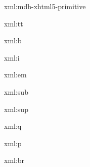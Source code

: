 
\startxmlsetups xml:mdb-xhtml5-primitive
\stopxmlsetups


\startxmlsetups xml:tt
	{\tt {}}
\stopxmlsetups

\startxmlsetups xml:b
	{\bf {}}
\stopxmlsetups

\startxmlsetups xml:i
	{\it {}}
\stopxmlsetups

\startxmlsetups xml:em
	{\em {}}
\stopxmlsetups

\startxmlsetups xml:sub
\stopxmlsetups

\startxmlsetups xml:sup
\stopxmlsetups

\startxmlsetups xml:q
\stopxmlsetups

\startxmlsetups xml:p
	\par
\stopxmlsetups

\startxmlsetups xml:br
	\crlf
\stopxmlsetups

